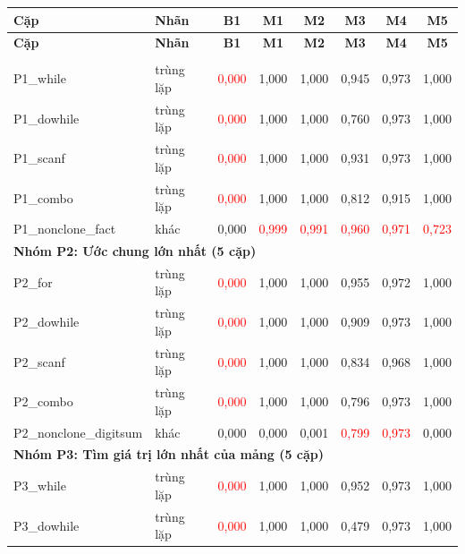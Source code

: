 \documentclass[11pt,a4paper]{article}
\begin{document}
{\small
\setlength{\tabcolsep}{5pt}
\begin{longtable}{llcccccc}
\toprule
\textbf{Cặp} & \textbf{Nhãn} & \textbf{B1} & \textbf{M1} & \textbf{M2} & \textbf{M3} & \textbf{M4} & \textbf{M5} \\
\midrule
\endfirsthead
\toprule
\textbf{Cặp} & \textbf{Nhãn} & \textbf{B1} & \textbf{M1} & \textbf{M2} & \textbf{M3} & \textbf{M4} & \textbf{M5} \\
\midrule
\endhead
\bottomrule
\endlastfoot
\multicolumn{8}{l}{\textbf{Nhóm P1: Tính tổng $1..n$ (5 cặp)}} \\
\midrule
P1\_while              & trùng lặp  & \textcolor{red}{0,000} & 1,000 & 1,000 & 0,945 & 0,973 & 1,000 \\
P1\_dowhile            & trùng lặp  & \textcolor{red}{0,000} & 1,000 & 1,000 & 0,760 & 0,973 & 1,000 \\
P1\_scanf              & trùng lặp  & \textcolor{red}{0,000} & 1,000 & 1,000 & 0,931 & 0,973 & 1,000 \\
P1\_combo              & trùng lặp  & \textcolor{red}{0,000} & 1,000 & 1,000 & 0,812 & 0,915 & 1,000 \\
P1\_nonclone\_fact     & khác       & 0,000 & \textcolor{red}{0,999} & \textcolor{red}{0,991} & \textcolor{red}{0,960} & \textcolor{red}{0,971} & \textcolor{red}{0,723} \\
\midrule
\multicolumn{8}{l}{\textbf{Nhóm P2: Ước chung lớn nhất (5 cặp)}} \\
\midrule
P2\_for                & trùng lặp  & \textcolor{red}{0,000} & 1,000 & 1,000 & 0,955 & 0,972 & 1,000 \\
P2\_dowhile            & trùng lặp  & \textcolor{red}{0,000} & 1,000 & 1,000 & 0,909 & 0,973 & 1,000 \\
P2\_scanf              & trùng lặp  & \textcolor{red}{0,000} & 1,000 & 1,000 & 0,834 & 0,968 & 1,000 \\
P2\_combo              & trùng lặp  & \textcolor{red}{0,000} & 1,000 & 1,000 & 0,796 & 0,973 & 1,000 \\
P2\_nonclone\_digitsum & khác       & 0,000 & 0,000 & 0,001 & \textcolor{red}{0,799} & \textcolor{red}{0,973} & 0,000 \\
\midrule
\multicolumn{8}{l}{\textbf{Nhóm P3: Tìm giá trị lớn nhất của mảng (5 cặp)}} \\
\midrule
P3\_while              & trùng lặp  & \textcolor{red}{0,000} & 1,000 & 1,000 & 0,952 & 0,973 & 1,000 \\
P3\_dowhile            & trùng lặp  & \textcolor{red}{0,000} & 1,000 & 1,000 & 0,479 & 0,973 & 1,000 \\

\end{longtable}}
\end{document}
